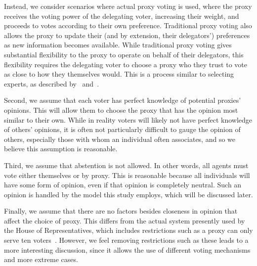 Instead, we consider scenarios where actual proxy voting is used, where the proxy
receives the voting power of the delegating voter, increasing their weight, and
proceeds to votes according to their own preference.
Traditional proxy voting also allows the proxy to update their (and by extension, their
delegators') preferences as new information becomes available.
While traditional proxy voting gives substantial flexibility to the proxy to
operate on behalf of their delegators, this flexibility requires the delegating voter
to choose a proxy who they trust to vote as close to how they themselves would.
This is a process similar to selecting experts, as described by~\cite{Miller1969}
and~\cite{Mueller1972}.

Second, we assume that each voter has perfect knowledge of potential proxies' opinions.
This will allow them to choose the proxy that has the opinion most similar to their own.
While in reality voters will likely not have perfect knowledge of others' opinions,
it is often not particularly difficult to gauge the opinion of others, especially
those with whom an individual often associates, and so we believe this assumption is
reasonable.

Third, we assume that abstention is not allowed.
In other words, all agents must vote either themselves or by proxy.
This is reasonable because all individuals will have some form of opinion, even if
that opinion is completely neutral.
Such an opinion is handled by the model this study employs, which will be discussed
later. 

Finally, we assume that there are no factors besides closeness in opinion that affect
the choice of proxy.
This differs from the actual system presently used by the House of Representatives,
which includes restrictions such as a proxy can only serve ten voters~\cite{CERP2020}.
However, we feel removing restrictions such as these leads to a more interesting
discussion, since it allows the use of different voting mechanisms and more extreme
cases.



